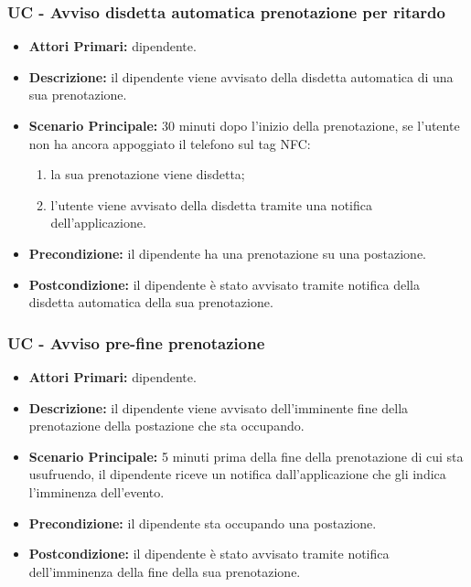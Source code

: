 \subsubsection{ UC - Avviso disdetta automatica prenotazione per ritardo }
\begin{itemize}
	\item\textbf{Attori Primari:} dipendente.
	\item\textbf{Descrizione:} il dipendente viene avvisato della disdetta automatica di una sua prenotazione.
	\item\textbf{Scenario Principale:} 30 minuti dopo l'inizio della prenotazione, se l'utente non ha ancora appoggiato il telefono sul tag NFC:
	\begin{enumerate}
		\item la sua prenotazione viene disdetta;
		\item l'utente viene avvisato della disdetta tramite una notifica dell'applicazione.
	\end{enumerate}
	\item\textbf{Precondizione:} il dipendente ha una prenotazione su una postazione.
	\item\textbf{Postcondizione:} il dipendente è stato avvisato tramite notifica della disdetta automatica della sua prenotazione.
\end{itemize}

\subsubsection{ UC - Avviso pre-fine prenotazione}
\begin{itemize}
	\item\textbf{Attori Primari:} dipendente.
	\item\textbf{Descrizione:} il dipendente viene avvisato dell'imminente fine della prenotazione della postazione che sta occupando.
	\item\textbf{Scenario Principale:} 5 minuti prima della fine della prenotazione di cui sta usufruendo, il dipendente riceve un notifica dall'applicazione che gli indica l'imminenza dell'evento.
	\item\textbf{Precondizione:} il dipendente sta occupando una postazione.
	\item\textbf{Postcondizione:} il dipendente è stato avvisato tramite notifica dell'imminenza della fine della sua prenotazione.
\end{itemize}

